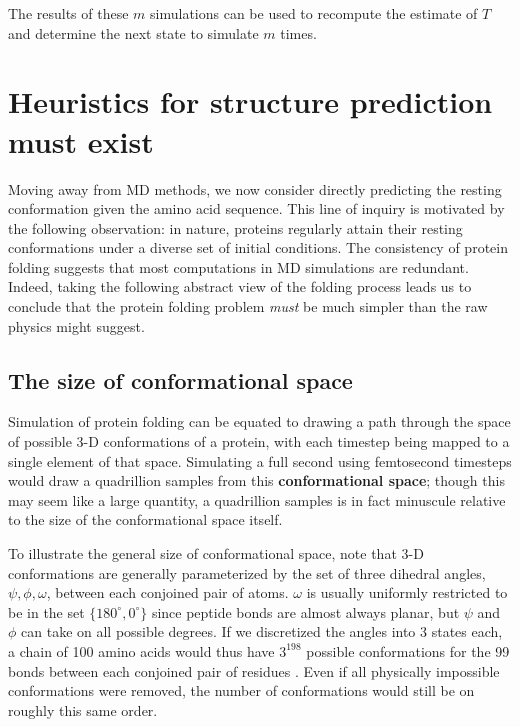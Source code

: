 \documentclass{article}
\begin{document}
The results of these $m$ simulations can be used to recompute the estimate of $T$ and determine the next state to simulate $m$ times.

\section{Heuristics for structure prediction must exist}
Moving away from MD methods, we now consider directly predicting the resting conformation given the amino acid sequence. This line of inquiry is motivated by the following observation: in nature, proteins regularly attain their resting conformations under a diverse set of initial conditions. The consistency of protein folding suggests that most computations in MD simulations are redundant. Indeed, taking the following abstract view of the folding process leads us to conclude that the protein folding problem \textit{must} be much simpler than the raw physics might suggest.

\subsection{The size of conformational space}
Simulation of protein folding can be equated to drawing a path through the space of possible 3-D conformations of a protein, with each timestep being mapped to a single element of that space. Simulating a full second using femtosecond timesteps would draw a quadrillion samples from this \textbf{conformational space}; though this may seem like a large quantity, a quadrillion samples is in fact minuscule relative to the size of the conformational space itself.

To illustrate the general size of conformational space, note that 3-D conformations are generally parameterized by the set of three dihedral angles, $\psi, \phi, \omega$, between each conjoined pair of atoms. $\omega$ is usually uniformly restricted to be in the set $\{180^\circ, 0^\circ\}$ since peptide bonds are almost always planar, but $\psi$ and $\phi$ can take on all possible degrees. If we discretized the angles into 3 states each, a chain of 100 amino acids would thus have $3^198$ possible conformations for the 99 bonds between each conjoined pair of residues \cite{levinthal}. Even if all physically impossible conformations were removed, the number of conformations would still be on roughly this same order.
\end{document}

